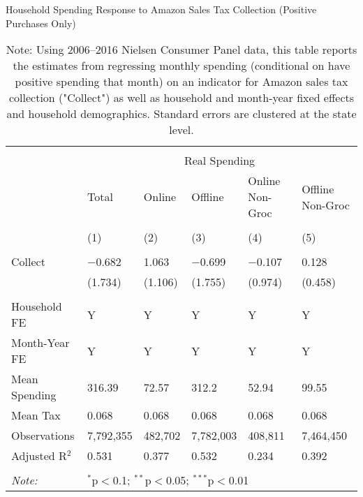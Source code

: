 
\begin{table}[!htbp] \centering
  \caption{Household Spending Response to Amazon Sales Tax Collection (Positive Purchases Only)}
  \label{tab:nielsenDiDConditional}
\begin{tabularx}{\textwidth}{lXXXXX}
\\[-1.8ex]\hline
\hline \\[-1.8ex]
 & \multicolumn{5}{c}{Real Spending} \\
\cline{2-6}
 & Total & Online & Offline & Online Non-Groc & Offline Non-Groc \\
\\[-1.8ex] & (1) & (2) & (3) & (4) & (5)\\
\hline \\[-1.8ex]
 Collect & $-$0.682 & 1.063 & $-$0.699 & $-$0.107 & 0.128 \\
  & (1.734) & (1.106) & (1.755) & (0.974) & (0.458) \\
 \hline \\[-1.8ex]
Household FE & Y & Y & Y & Y & Y \\
Month-Year FE & Y & Y & Y & Y & Y \\
Mean Spending & 316.39 & 72.57 & 312.2 & 52.94 & 99.55 \\
Mean Tax & 0.068 & 0.068 & 0.068 & 0.068 & 0.068 \\
Observations & 7,792,355 & 482,702 & 7,782,003 & 408,811 & 7,464,450 \\
Adjusted R$^{2}$ & 0.531 & 0.377 & 0.532 & 0.234 & 0.392 \\
\hline
\hline \\[-1.8ex]
\textit{Note:}  & \multicolumn{5}{l}{$^{*}$p$<$0.1; $^{**}$p$<$0.05; $^{***}$p$<$0.01} \\
\end{tabularx}
\caption*{Note: Using 2006--2016 Nielsen Consumer Panel data, this table reports the estimates from regressing monthly spending (conditional on have positive spending that month) on an indicator for Amazon sales tax collection ("Collect") as well as household and month-year fixed effects and household demographics. Standard errors are clustered at the state level.}
\end{table}
